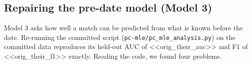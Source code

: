 \subsection{Repairing the pre-date model (Model 3)}\label{sec:model3fix}

Model 3 asks how well a match can be predicted from what is known before the date. Re-running the
committed script (\texttt{pc-mle/pc\_mle\_analysis.py}) on the committed data reproduces its
held-out AUC of <<orig_their_auc>> and F1 of <<orig_their_f1>> exactly. Reading the code, we found
four problems.

